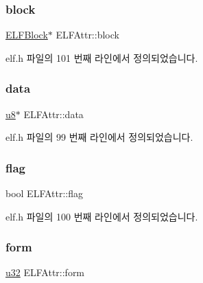 \mbox{\label{struct_e_l_f_attr_a2f3b05bdc1a38fd871bbd17017e14a75}} 
\subsubsection{\texorpdfstring{block}{block}}
{\footnotesize\ttfamily \mbox{\hyperlink{struct_e_l_f_block}{E\+L\+F\+Block}}$\ast$ E\+L\+F\+Attr\+::block}



elf.\+h 파일의 101 번째 라인에서 정의되었습니다.

\mbox{\label{struct_e_l_f_attr_a050f3a442c8113639c5f3b614300b181}} 
\subsubsection{\texorpdfstring{data}{data}}
{\footnotesize\ttfamily \mbox{\hyperlink{_system_8h_aed742c436da53c1080638ce6ef7d13de}{u8}}$\ast$ E\+L\+F\+Attr\+::data}



elf.\+h 파일의 99 번째 라인에서 정의되었습니다.

\mbox{\label{struct_e_l_f_attr_aa1241e542253a24e5df8b0102602d0a9}} 
\subsubsection{\texorpdfstring{flag}{flag}}
{\footnotesize\ttfamily bool E\+L\+F\+Attr\+::flag}



elf.\+h 파일의 100 번째 라인에서 정의되었습니다.

\mbox{\label{struct_e_l_f_attr_a21299233079c1bb24e10eea813f6f1b6}} 
\subsubsection{\texorpdfstring{form}{form}}
{\footnotesize\ttfamily \mbox{\hyperlink{_system_8h_a10e94b422ef0c20dcdec20d31a1f5049}{u32}} E\+L\+F\+Attr\+::form}



